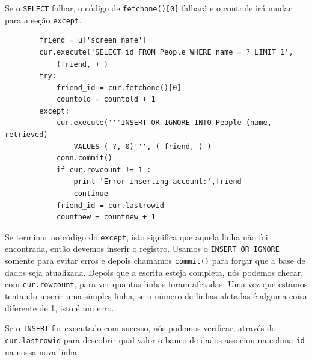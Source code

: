 
Se o {\tt SELECT} falhar, o código de {\tt fetchone()[0]} falhará e o controle
irá mudar para a seção {\tt except}.

\beforeverb
\begin{verbatim}
        friend = u['screen_name']
        cur.execute('SELECT id FROM People WHERE name = ? LIMIT 1',
            (friend, ) )
        try:
            friend_id = cur.fetchone()[0]
            countold = countold + 1
        except:
            cur.execute('''INSERT OR IGNORE INTO People (name, retrieved) 
                VALUES ( ?, 0)''', ( friend, ) )
            conn.commit()
            if cur.rowcount != 1 :
                print 'Error inserting account:',friend
                continue
            friend_id = cur.lastrowid
            countnew = countnew + 1
\end{verbatim}
\afterverb
%

Se terminar no código do {\tt except}, isto significa que aquela linha não foi
encontrada, então devemos inserir o registro. Usamos o {\tt INSERT OR IGNORE}
somente para evitar erros e depois chamamos {\tt commit()} para forçar que a
base de dados seja atualizada. Depois que a escrita esteja completa, nós
podemos checar, com {\tt cur.rowcount}, para ver quantas linhas foram afetadas.
Uma vez que estamos tentando inserir uma simples linha, se o número de linhas
afetadas é alguma coisa diferente de 1, isto é um erro.


Se o {\tt INSERT} for executado com sucesso, nós podemos verificar, através do
{\tt cur.lastrowid} para descobrir qual valor o banco de dados associou na
coluna {\tt id} na nossa nova linha.

